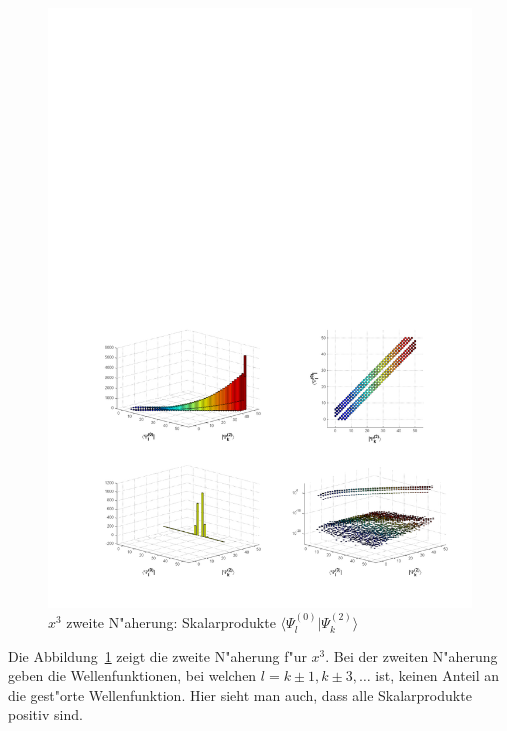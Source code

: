 \begin{refsection}
\begin{figure}	%
\centering
\includegraphics[width=1.0\textwidth]{anharmonisch/images/x3/Stoerung2Skalare.pdf}
\caption{$x^3$ zweite N"aherung: Skalarprodukte $\langle\Psi_l^{(0)}|\Psi_k^{(2)}\rangle$ 
\label{skript:x3_Stoerung2Skalare}}
\end{figure}

Die Abbildung~\ref{skript:x3_Stoerung2Skalare} zeigt die zweite N"aherung f"ur $x^3$.
Bei der zweiten N"aherung geben die Wellenfunktionen,
bei welchen $l=k\pm 1,k\pm 3,\dots$ ist,
keinen Anteil an die gest"orte Wellenfunktion.
Hier sieht man auch, dass alle Skalarprodukte positiv sind.


\end{refsection}
